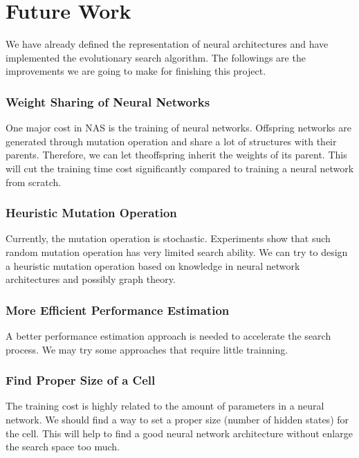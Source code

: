 \documentclass[conference]{IEEEtran}
\begin{document}
 \section{Future Work}  

 We have already defined the representation of neural architectures and have implemented the evolutionary search algorithm. The followings are the improvements we are going to make for finishing this project.
 
  
  \subsubsection{Weight Sharing of Neural Networks}    
  One major cost in NAS is the training of neural networks. Offspring networks are generated through mutation operation and share a lot of structures with their parents. Therefore, we can let theoffspring inherit the weights of its parent. This will cut the training time cost significantly compared to training a neural network from scratch.
  
  \subsubsection{Heuristic Mutation Operation}
  Currently, the mutation operation is stochastic. Experiments show that such random mutation operation has very limited search ability. We can try to design a heuristic mutation operation based on knowledge in neural network architectures and possibly graph theory.
  
  \subsubsection{More Efficient Performance Estimation}
  A better performance estimation approach is needed to accelerate the search process. We may try some approaches that require little trainning.
  
  \subsubsection{Find Proper Size of a Cell}
  The training cost is highly related to the amount of parameters in a neural network. We should find a way to set a proper size (number of hidden states) for the cell. This will help to find a good neural network architecture without enlarge the search space too much.
   



\end{document}
